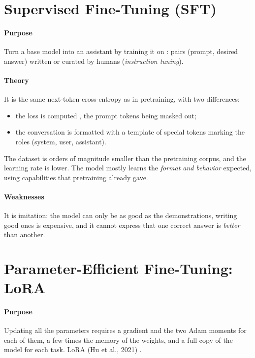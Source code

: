 \section{Supervised Fine-Tuning (SFT)}
\paragraph{Purpose}
Turn a base model into an assistant by training it on : pairs
(prompt, desired answer) written or curated by humans (\emph{instruction tuning}).

\paragraph{Theory}
It is the same next-token cross-entropy as in pretraining, with two differences:
\begin{itemize}
    \item the loss is computed , the prompt tokens being
        masked out;
    \item the conversation is formatted with a template of special tokens marking the roles
        (system, user, assistant).
\end{itemize}
The dataset is orders of magnitude smaller than the pretraining corpus, and the learning rate
is lower. The model mostly learns the \emph{format and behavior} expected, using
capabilities that pretraining already gave.

\paragraph{Weaknesses}
It is imitation: the model can only be as good as the demonstrations, writing good ones is
expensive, and it cannot express that one correct answer is \emph{better} than another.

\section{Parameter-Efficient Fine-Tuning: LoRA}
\paragraph{Purpose}
Updating all the parameters requires a gradient and the two Adam moments for each of them, a
few times the memory of the weights, and a full copy of the model for each task. LoRA
(Hu et al., 2021) .

